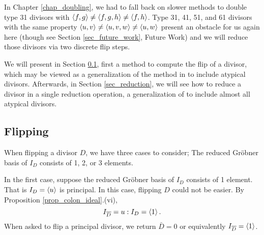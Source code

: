 In Chapter \ref{chap_doubling}, we had to fall back on slower methods
to double type 31 divisors with $\left\langle f,g \right\rangle \neq \left\langle f,g,h \right\rangle \neq \left\langle f,h \right\rangle$.
Type 31, 41, 51, and 61 divisors with the same property $\left\langle u,v \right\rangle \neq \left\langle u,v,w \right\rangle \neq \left\langle u,w \right\rangle$
present an obstacle for us again here (though see Section \ref{sec_future_work}, Future Work)
and we will reduce those divisors via two discrete flip steps.

We will present in Section \ref{sec_flipping}, first a method to compute the flip of a divisor,
which may be viewed as a generalization of the method in \cite{salem07} to include atypical divisors.
Afterwards, in Section \ref{sec_reduction}, we will see how to reduce a divisor in a single reduction operation,
a generalization of \cite{kmakdisi18} to include almost all atypical divisors.




\subsection{Flipping}
\label{sec_flipping}

When flipping a divisor $D$, we have three cases to consider;
The reduced Gr\"obner basis of $I_D$ consists of 1, 2, or 3 elements.

In the first case, suppose the reduced Gr\"obner basis of $I_D$ consists of 1 element.
That is $I_D = \left\langle u \right\rangle$ is principal.
In this case, flipping $D$ could not be easier.
By Proposition \ref{prop_colon_ideal}.(vi),
\[ I_{\overline D} = u : I_D = \left\langle 1 \right\rangle. \]
When asked to flip a principal divisor, we return $\bar D = 0$ or equivalently $I_{\overline D} = \left\langle 1 \right\rangle$.

